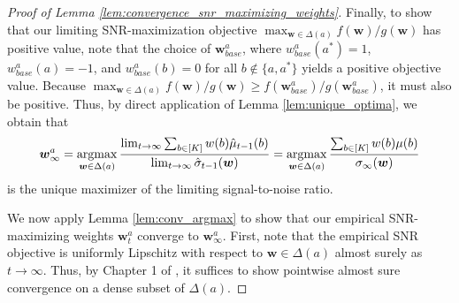 \documentclass{article}
\begin{document}
\begin{appendices}
\begin{proof}[Proof of Lemma \ref{lem:convergence_snr_maximizing_weights}]
Finally, to show that our limiting SNR-maximization objective $ \max_{\bm{w}\in\Delta(a)} f(\bm{w})/g(\bm{w})$ has positive value, note that the choice of $\bm{w}^a_{base}$, where $w^a_{base}(a^*) = 1$, $w^a_{base}(a) = -1$, and $w^a_{base}(b) = 0$ for all $b \not\in \{a, a^*\}$ yields a positive objective value. Because $ \max_{\bm{w}\in\Delta(a)} f(\bm{w})/g(\bm{w}) \geq f(\bm{w}_{base}^a)/ g(\bm{w}_{base}^a)$, it must also be positive. Thus, by direct application of Lemma \ref{lem:unique_optima}, we obtain that 
\begin{equation}
 \bm{w}_\infty^a = \argmax_{\bm{w} \in \Delta(a)} \frac{\lim_{t \rightarrow \infty} \sum_{b \in [K]} w(b)\hat\mu_{t-1}(b)}{\lim_{t \rightarrow \infty}\hat\sigma_{t-1}(\bm{w})}    = \argmax_{\bm{w} \in \Delta(a)} \frac{\sum_{b \in [K]} w(b) \mu(b)}{\sigma_\infty(\bm{w})}
\end{equation}
is the unique maximizer of the limiting signal-to-noise ratio. 

We now apply Lemma \ref{lem:conv_argmax} to show that our empirical SNR-maximizing weights $\bm{w}_t^a$ converge to $\bm{w}_\infty^a$. First, note that the empirical SNR objective is uniformly Lipschitz with respect to $\bm{w} \in \Delta(a)$ almost surely as $t \rightarrow \infty$. Thus, by Chapter 1 of \cite{vandervaart1996weak}, it suffices to show pointwise almost sure convergence on a dense subset of $\Delta(a)$. 


\end{proof}
\end{appendices}
\end{document}
